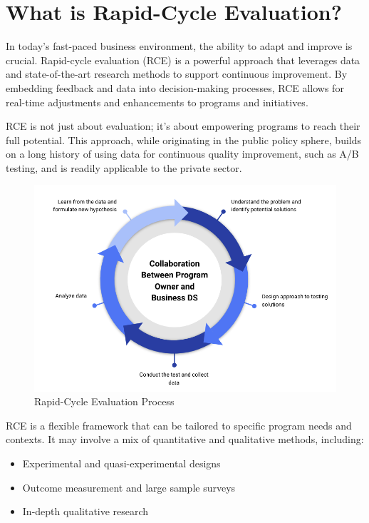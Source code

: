 \documentclass[
  letterpaper,
  DIV=11,
  numbers=noendperiod]{scrreprt}
\providecommand{\tightlist}{%
  \setlength{\itemsep}{0pt}\setlength{\parskip}{0pt}}\usepackage{longtable,booktabs,array}
\begin{document}
\section{What is Rapid-Cycle
Evaluation?}\label{what-is-rapid-cycle-evaluation}

In today's fast-paced business environment, the ability to adapt and
improve is crucial. Rapid-cycle evaluation (RCE) is a powerful approach
that leverages data and state-of-the-art research methods to support
continuous improvement. By embedding feedback and data into
decision-making processes, RCE allows for real-time adjustments and
enhancements to programs and initiatives.

RCE is not just about evaluation; it's about empowering programs to
reach their full potential. This approach, while originating in the
public policy sphere, builds on a long history of using data for
continuous quality improvement, such as A/B testing, and is readily
applicable to the private sector.

\begin{figure}[H]

{\centering \includegraphics{img/RCE.png}

}

\caption{Rapid-Cycle Evaluation Process}

\end{figure}%

RCE is a flexible framework that can be tailored to specific program
needs and contexts. It may involve a mix of quantitative and qualitative
methods, including:

\begin{itemize}
\tightlist
\item
  Experimental and quasi-experimental designs
\item
  Outcome measurement and large sample surveys
\item
  In-depth qualitative research
\end{itemize}
\end{document}
